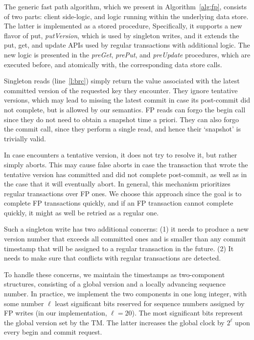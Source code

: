 The generic fast  path algorithm, which we present in Algorithm~\ref{alg:fp}, consists of two parts: 
client side-logic, and logic running within the underlying data store. 
The latter is implemented as a stored procedure, %
Specifically, it supports a new flavor of put, \emph{putVersion}, which is used by singleton writes, 
and it extends the put, get, and update APIs used by regular transactions with additional logic.  
The new logic is presented in the \emph{preGet}, \emph{prePut}, and \emph{preUpdate} procedures, 
which are  executed before, and atomically with, the corresponding data store calls.

Singleton reads (line~\ref{l:brc}) simply return the value associated with the  latest committed version of the requested key they encounter.  
They ignore tentative versions, which may lead to missing the latest commit in case its post-commit did not complete, 
but is allowed by our semantics. 
FP reads can forgo the begin call since they do not need to obtain a snapshot time a priori. 
They can also forgo the commit call, since they perform a single read, and hence their `snapshot' is trivially valid.

In case   encounters a tentative version, it does not try to resolve it, but rather simply aborts.
This may cause false aborts in case the transaction that wrote the tentative version has committed and did not 
complete post-commit, as well as in the case that it will eventually abort. 
In general, this mechanism prioritizes regular transactions over FP ones. We choose this approach since
the goal is to complete FP transactions quickly, and if an FP transaction cannot complete quickly, it might as well be 
retried as a regular one.
   
Such a singleton write has two additional concerns: (1) it needs to  produce a new version number that exceeds all committed ones and
is smaller than any commit timestamp that will be assigned to a regular transaction in the future.
(2)  It needs to make sure that conflicts with regular transactions are detected. 

To handle these concerns,  
we maintain the timestamps as two-component structures, consisting of a global version and a locally advancing sequence number.
In practice, we implement the two components in one long integer, with some number $\ell$ least significant bits
reserved for sequence numbers assigned by FP writes (in our implementation, $\ell=20$).
The most significant bits represent the global version set by the TM. The latter increases 
the global clock by $2^\ell$ upon every begin and commit request.

